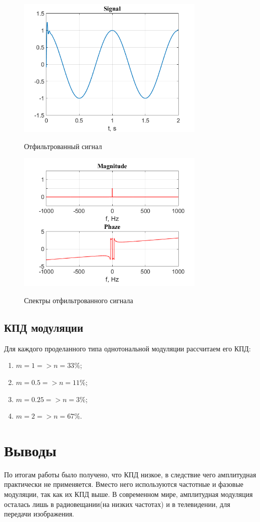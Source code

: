 \documentclass[a4paper,14pt]{article}
\begin{document}
\begin{figure}[h]
\begin{multicols}{1}
\hfill
\includegraphics[width=90mm]{am6}
\hfill
\caption{Отфильтрованный сигнал}
\label{figBottom}
\hfill
\includegraphics[width=90mm]{am6_spec}
\hfill
\caption{Спектры отфильтрованного сигнала}
\label{figDown}
\end{multicols}
\end{figure}

\newpage
\subsection{КПД модуляции}
Для каждого проделанного типа однотональной модуляции рассчитаем его КПД:
\begin{enumerate}
\item $m = 1 => n = 33\%$;
\item $m = 0.5 => n = 11\%$;
\item $m = 0.25 => n = 3\%$;
\item $m = 2 => n = 67\%$.
\end{enumerate}

\section{Выводы}
\hspace{0,5cm}
По итогам работы было получено, что КПД низкое, в следствие чего амплитудная практически не применяется. Вместо него используются частотные и фазовые модуляции, так как их КПД выше. В современном мире, амплитудная модуляция осталась лишь в радиовещании(на низких частотах) и в телевидении, для передачи изображения.
\end{document}
